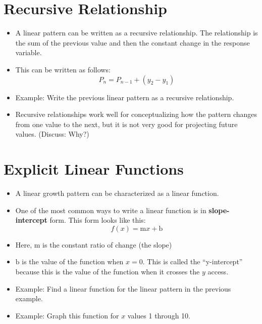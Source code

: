 \documentclass{article}
\begin{document}
\section*{Recursive Relationship}
\begin{itemize}
	\item A linear pattern can be written as a recursive relationship.  The relationship is the sum of the previous value and then the constant change in the response variable. 
	\item This can be written as follows:
	\[
	P_n = P_{n-1} + (y_2 - y_1)
	\]
	\item Example:  Write the previous linear pattern as a recursive relationship.
	\item Recursive relationships work well for conceptualizing how the pattern changes from one value to the next, but it is not very good for projecting future values.  (Discuss: Why?)
\end{itemize}

\section*{Explicit Linear Functions}
\begin{itemize}
	\item A linear growth pattern can be characterized as a linear function.
	\item One of the most common ways to write a linear function is in {\bf slope-intercept} form.  This form looks like this:
	\[
	f(x) = \mathrm{m} x + \mathrm{b}
	\]
	\item Here, $\mathrm{m}$ is the constant ratio of change (the slope)
	\item $\mathrm{b}$ is the value of the function when $x=0$.  This is called the ``y-intercept'' because this is the value of the function when it crosses the $y$ access.
	\item Example: Find a linear function for the linear pattern in the previous example.
	\item Example: Graph this function for $x$ values 1 through 10.
\end{itemize}
\end{document}
